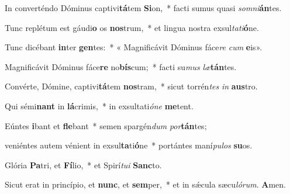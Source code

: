\item In converténdo Dóminus captivi\textbf{tá}tem \textbf{Si}on,~* facti sumus quasi \textit{somni}\textbf{án}tes.

\item Tunc replétum est gáudi\textbf{o} os \textbf{nos}trum,~* et lingua nostra exsul\textit{tati}\textbf{ó}ne.

\item Tunc dicébant \textbf{in}ter \textbf{gen}tes:~* « Magnificávit Dóminus fáce\textit{re} \textit{cum} \textbf{e}is».

\item Magnificávit Dóminus fáce\textbf{re} no\textbf{bís}cum;~* facti su\textit{mus} \textit{læ}\textbf{tán}tes.

\item Convérte, Dómine, captivi\textbf{tá}tem \textbf{nos}tram,~* sicut torrén\textit{tes} \textit{in} \textbf{aus}tro.

\item Qui sémi\textbf{nant} in \textbf{lá}crimis,~* in exsultati\textit{óne} \textbf{me}tent.

\item Eúntes \textbf{i}bant et \textbf{fle}bant~* semen spargén\textit{dum} \textit{por}\textbf{tán}tes;

\item veniéntes autem vénient in exsul\textbf{ta}ti\textbf{ó}ne~* portántes maní\textit{pulos} \textbf{su}os.

\item Glória \textbf{Pa}tri, et \textbf{Fí}lio,~* et Spirí\textit{tui} \textbf{Sanc}to.

\item Sicut erat in princípio, et \textbf{nunc}, et \textbf{sem}per,~* et in sǽcula sæcu\textit{lórum}. \textbf{A}men.